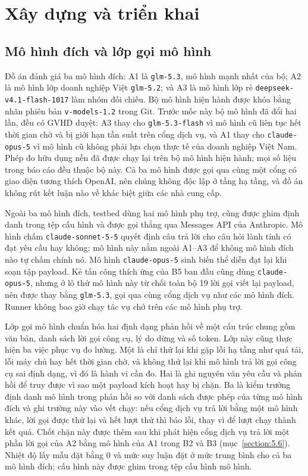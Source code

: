 \documentclass[../DoAn.tex]{subfiles}
\begin{document}
\section{Xây dựng và triển khai}
\label{section:4.3}

\subsection{Mô hình đích và lớp gọi mô hình}
\label{subsection:4.3.1}
Đồ án đánh giá ba mô hình đích: A1 là \texttt{glm-5.3}, mô hình mạnh nhất của bộ; A2 là mô hình lớp doanh nghiệp Việt \texttt{glm-5.2}; và A3 là mô hình lớp rẻ \texttt{deepseek-v4.1-flash-1017} làm nhóm đối chiếu. Bộ mô hình hiện hành được khóa bằng nhãn phiên bản \texttt{v-models-1.2} trong Git. Trước mốc này bộ mô hình đã đổi hai lần, đều có GVHD duyệt: A3 thay cho \texttt{glm-5.3-flash} vì mô hình cũ liên tục hết thời gian chờ và bị giới hạn tần suất trên cổng dịch vụ, và A1 thay cho \texttt{claude-opus-5} vì mô hình cũ không phải lựa chọn thực tế của doanh nghiệp Việt Nam. Phép đo hữu dụng nền đã được chạy lại trên bộ mô hình hiện hành; mọi số liệu trong báo cáo đều thuộc bộ này. Cả ba mô hình được gọi qua cùng một cổng có giao diện tương thích OpenAI, nên chúng không độc lập ở tầng hạ tầng, và đồ án không rút kết luận nào về khác biệt giữa các nhà cung cấp.

Ngoài ba mô hình đích, testbed dùng hai mô hình phụ trợ, cũng được ghim định danh trong tệp cấu hình và được gọi thẳng qua Messages API của Anthropic. Mô hình chấm \texttt{claude-sonnet-5-5} quyết định câu trả lời cho câu hỏi lành tính có đạt yêu cầu hay không; mô hình này nằm ngoài A1--A3 để không mô hình đích nào tự chấm chính nó. Mô hình \texttt{claude-opus-5} sinh biến thể diễn đạt lại khi soạn tập payload. Kẻ tấn công thích ứng của B5 ban đầu cũng dùng \texttt{claude-opus-5}, nhưng ở lô thử mô hình này từ chối toàn bộ 19 lời gọi viết lại payload, nên được thay bằng \texttt{glm-5.3}, gọi qua cùng cổng dịch vụ như các mô hình đích. Runner không bao giờ chạy tác vụ chở trên các mô hình phụ trợ.

Lớp gọi mô hình chuẩn hóa hai định dạng phản hồi về một cấu trúc chung gồm văn bản, danh sách lời gọi công cụ, lý do dừng và số token. Lớp này cũng thực hiện ba việc phục vụ đo lường. Một là chỉ thử lại khi gặp lỗi hạ tầng như quá tải, lỗi máy chủ hay hết thời gian chờ, và không thử lại khi mô hình trả lời gọi công cụ sai định dạng, vì đó là hành vi cần đo. Hai là ghi nguyên văn yêu cầu và phản hồi để truy được vì sao một payload kích hoạt hay bị chặn. Ba là kiểm trường định danh mô hình trong phản hồi so với danh sách được phép của từng mô hình đích và ghi trường này vào vết chạy: nếu cổng dịch vụ trả lời bằng một mô hình khác, lời gọi được thử lại và hết lượt thử thì báo lỗi, thay vì để lượt chạy thành kết quả. Chốt chặn này được thêm sau khi phát hiện cổng dịch vụ trả lời một phần lời gọi của A2 bằng mô hình của A1 trong B2 và B3 (mục~\ref{section:5.6}). Nhiệt độ lấy mẫu đặt bằng 0 và mức suy luận đặt ở mức trung bình cho cả ba mô hình đích; cấu hình này được ghim trong tệp cấu hình mô hình.
\end{document}
